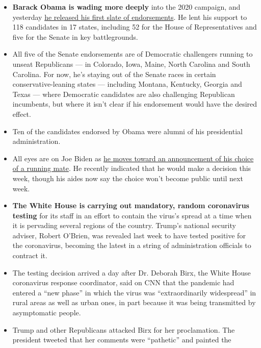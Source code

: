 \begin{itemize}
\item
  \textbf{Barack Obama is wading more deeply} into the 2020 campaign,
  and yesterday
  \href{https://www.nytimes.com/2020/08/03/us/elections/biden-vs-trump.html?action=click\&module=Top\%20Stories\&pgtype=Homepage\#link-3de249e6}{he
  released his first slate of endorsements}. He lent his support to 118
  candidates in 17 states, including 52 for the House of Representatives
  and five for the Senate in key battlegrounds.
\item
  All five of the Senate endorsements are of Democratic challengers
  running to unseat Republicans --- in Colorado, Iowa, Maine, North
  Carolina and South Carolina. For now, he's staying out of the Senate
  races in certain conservative-leaning states --- including Montana,
  Kentucky, Georgia and Texas --- where Democratic candidates are also
  challenging Republican incumbents, but where it isn't clear if his
  endorsement would have the desired effect.
\item
  Ten of the candidates endorsed by Obama were alumni of his
  presidential administration.
\item
  All eyes are on Joe Biden as
  \href{https://www.nytimes.com/article/biden-vice-president-2020.html?action=click\&pgtype=Article\&state=default\&module=styln-elections-2020\&region=TOP_BANNER\&context=storylines_menu}{he
  moves toward an announcement of his choice of a running mate}. He
  recently indicated that he would make a decision this week, though his
  aides now say the choice won't become public until next week.
\item
  \textbf{The White House is carrying out mandatory, random coronavirus
  testing} for its staff in an effort to contain the virus's spread at a
  time when it is pervading several regions of the country. Trump's
  national security adviser, Robert O'Brien, was revealed last week to
  have tested positive for the coronavirus, becoming the latest in a
  string of administration officials to contract it.
\item
  The testing decision arrived a day after Dr. Deborah Birx, the White
  House coronavirus response coordinator, said on CNN that the pandemic
  had entered a ``new phase'' in which the virus was ``extraordinarily
  widespread'' in rural areas as well as urban ones, in part because it
  was being transmitted by asymptomatic people.
\item
  Trump and other Republicans attacked Birx for her proclamation. The
  president tweeted that her comments were ``pathetic'' and painted the

\end{itemize}
